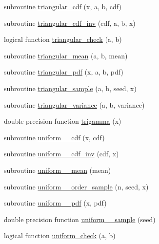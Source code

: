 \begin{DoxyCompactItemize}
\item 
subroutine \hyperlink{_bhabha__fortran__sem__doxy_8f_a829742571d36a8b07342c12ea3112f28}{triangular\+\_\+cdf} (x, a, b, cdf)
\item 
subroutine \hyperlink{_bhabha__fortran__sem__doxy_8f_ab66652c0bf9ae711b9b75cd1e6e251c5}{triangular\+\_\+cdf\+\_\+inv} (cdf, a, b, x)
\item 
logical function \hyperlink{_bhabha__fortran__sem__doxy_8f_a1075d4be52d9e73dc2d16c5e4578d58b}{triangular\+\_\+check} (a, b)
\item 
subroutine \hyperlink{_bhabha__fortran__sem__doxy_8f_aab67668dc75a0d2884868176020040bd}{triangular\+\_\+mean} (a, b, mean)
\item 
subroutine \hyperlink{_bhabha__fortran__sem__doxy_8f_a2ff19917924536f55f55531b148a4d60}{triangular\+\_\+pdf} (x, a, b, pdf)
\item 
subroutine \hyperlink{_bhabha__fortran__sem__doxy_8f_aa6b6114d8735ccfa463f60f4b9c08748}{triangular\+\_\+sample} (a, b, seed, x)
\item 
subroutine \hyperlink{_bhabha__fortran__sem__doxy_8f_a8e94727635c279a064a2c497a9175a04}{triangular\+\_\+variance} (a, b, variance)
\item 
double precision function \hyperlink{_bhabha__fortran__sem__doxy_8f_aa287ba105f62a96aee81e3a9f0b0fc6d}{trigamma} (x)
\item 
subroutine \hyperlink{_bhabha__fortran__sem__doxy_8f_a4542d552be72b2153a3e27324241d9b1}{uniform\+\_\+\_\+cdf} (x, cdf)
\item 
subroutine \hyperlink{_bhabha__fortran__sem__doxy_8f_a72aba79732c10141024277c78076d1c4}{uniform\+\_\+\_\+cdf\+\_\+inv} (cdf, x)
\item 
subroutine \hyperlink{_bhabha__fortran__sem__doxy_8f_a703c0741a0197996b0e9c9341bc0fb20}{uniform\+\_\+\_\+mean} (mean)
\item 
subroutine \hyperlink{_bhabha__fortran__sem__doxy_8f_ac1f3e1cf38a7750036257dd222d4d133}{uniform\+\_\+\_\+order\+\_\+sample} (n, seed, x)
\item 
subroutine \hyperlink{_bhabha__fortran__sem__doxy_8f_a20a976304b1a9dc6e1fbc03e504bc1ef}{uniform\+\_\+\_\+pdf} (x, pdf)
\item 
double precision function \hyperlink{_bhabha__fortran__sem__doxy_8f_a486635f122e7078b243c9f56a9a1e247}{uniform\+\_\+\_\+sample} (seed)
\item 
logical function \hyperlink{_bhabha__fortran__sem__doxy_8f_aa375f84c7dcbc6bd08516cb6c18fcf8a}{uniform\+\_\+check} (a, b)

\end{DoxyCompactItemize}
